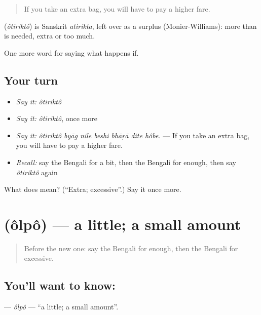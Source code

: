 \begin{quote}
If you take an extra bag, you will have to pay a higher fare.
\end{quote}

\begin{cousinweb}
\textbf{} (\emph{ôtiriktô}) is Sanskrit \emph{atirikta}, left over as a surplus (Monier-Williams): more than is needed, extra or too much.
\end{cousinweb}

\begin{grammarlens}[title={What you've built}]
One more word for saying what happens if.
\end{grammarlens}

\subsection*{Your turn}
\begin{itemize}
\raggedright
  \item \emph{Say it:} \emph{ôtiriktô}
  \item \emph{Say it:} \emph{ôtiriktô}, once more
  \item \emph{Say it:} \emph{ôtiriktô byāg nile beshi bhāṛā dite hôbe.} — If you take an extra bag, you will have to pay a higher fare.
  \item \emph{Recall:} say the Bengali for a bit, then the Bengali for enough, then say \emph{ôtiriktô} again
\end{itemize}

\begin{tcolorbox}[breakable,colback=teal!4,colframe=teal!35!black,title={Before you move on}]
What does  mean? (\textquotedblleft{}Extra; excessive\textquotedblright{}.) Say it once more.
\end{tcolorbox}
\section[\texorpdfstring{\bn{অল্প} (ôlpô)}{অল্প (ôlpô)}]{ (ôlpô) — a little; a small amount}

\label{lesson:BN-C371-olpo}



\begin{quote}
Before the new one: say the Bengali for enough, then the Bengali for excessive.
\end{quote}

\subsection*{You'll want to know: }
\textbf{} — \emph{ôlpô} — \textquotedblleft{}a little; a small amount\textquotedblright{}.

